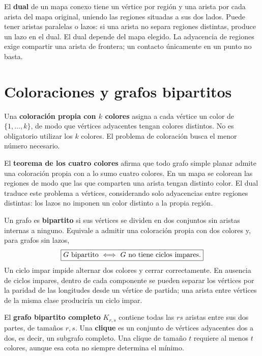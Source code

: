 El \textbf{dual} de un mapa conexo tiene un vértice por región
y una arista por cada arista del mapa original, uniendo las regiones
situadas a sus dos lados. Puede tener aristas paralelas o lazos:
si una arista no separa regiones distintas, produce un lazo en el dual.
El dual depende del mapa elegido.
La adyacencia de regiones exige compartir una arista de frontera;
un contacto únicamente en un punto no basta.

\section{Coloraciones y grafos bipartitos}
\label{md:coloracion}

Una \textbf{coloración propia con $k$ colores} asigna a cada vértice
un color de $\{1,\ldots,k\}$, de modo que vértices adyacentes
tengan colores distintos. No es obligatorio utilizar los $k$ colores.
El problema de coloración busca el menor número necesario.

El \textbf{teorema de los cuatro colores} afirma que todo grafo simple
planar admite una coloración propia con a lo sumo cuatro colores.
En un mapa se colorean las regiones de modo que las que comparten
una arista tengan distinto color. El dual traduce este problema a
vértices, considerando solo adyacencias entre regiones distintas:
los lazos no imponen un color distinto a la propia región.

Un grafo es \textbf{bipartito} si sus vértices se dividen en dos conjuntos
sin aristas internas a ninguno. Equivale a admitir una coloración
propia con dos colores y, para grafos sin lazos,
\[
 \boxed{G\text{ bipartito}\ \Longleftrightarrow\ G\text{ no tiene ciclos impares}.}
\]
Un ciclo impar impide alternar dos colores y cerrar correctamente.
En ausencia de ciclos impares, dentro de cada componente se pueden
separar los vértices por la paridad de las longitudes desde un vértice
de partida; una arista entre vértices de la misma clase produciría
un ciclo impar.

El \textbf{grafo bipartito completo} $K_{r,s}$ contiene todas las
$rs$ aristas entre sus dos partes, de tamaños $r,s$.
Una \textbf{clique} es un conjunto de vértices adyacentes dos a dos,
es decir, un subgrafo completo. Una clique de tamaño $t$ requiere
al menos $t$ colores, aunque esa cota no siempre determina el mínimo.
